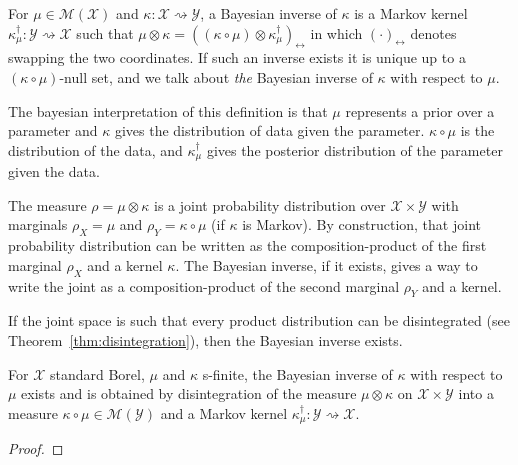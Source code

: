 \begin{definition}
  \label{def:bayesInv}
  \mathlibok
  For $\mu \in \mathcal M(\mathcal X)$ and $\kappa : \mathcal X \rightsquigarrow \mathcal Y$, a Bayesian inverse of $\kappa$ is a Markov kernel $\kappa_\mu^\dagger : \mathcal Y \rightsquigarrow \mathcal X$ such that $\mu \otimes \kappa = ((\kappa \circ \mu) \otimes \kappa_\mu^\dagger)_\leftrightarrow$ in which $(\cdot)_\leftrightarrow$ denotes swapping the two coordinates.
  If such an inverse exists it is unique up to a $(\kappa \circ \mu)$-null set, and we talk about \emph{the} Bayesian inverse of $\kappa$ with respect to $\mu$.
\end{definition}

The bayesian interpretation of this definition is that $\mu$ represents a prior over a parameter and $\kappa$ gives the distribution of data given the parameter. $\kappa \circ \mu$ is the distribution of the data, and $\kappa_\mu^\dagger$ gives the posterior distribution of the parameter given the data.

The measure $\rho = \mu \otimes \kappa$ is a joint probability distribution over $\mathcal X \times \mathcal Y$ with marginals $\rho_X = \mu$ and $\rho_Y = \kappa \circ \mu$ (if $\kappa$ is Markov). By construction, that joint probability distribution can be written as the composition-product of the first marginal $\rho_X$ and a kernel $\kappa$. The Bayesian inverse, if it exists, gives a way to write the joint as a composition-product of the second marginal $\rho_Y$ and a kernel. 

If the joint space is such that every product distribution can be disintegrated (see Theorem~\ref{thm:disintegration}), then the Bayesian inverse exists.

\begin{lemma}
  \label{lem:exists_bayesInv}
  \mathlibok
  For $\mathcal X$ standard Borel, $\mu$ and $\kappa$ s-finite, the Bayesian inverse of $\kappa$ with respect to $\mu$ exists and is obtained by disintegration of the measure $\mu \otimes \kappa$ on $\mathcal X \times \mathcal Y$ into a measure $\kappa \circ \mu \in \mathcal M(\mathcal Y)$ and a Markov kernel $\kappa_\mu^\dagger : \mathcal Y \rightsquigarrow \mathcal X$.
\end{lemma}

\begin{proof}\mathlibok
{}

\end{proof}


